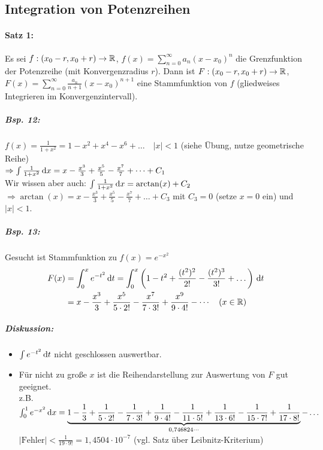 \subsection{Integration von Potenzreihen}
\paragraph{Satz 1:} Es sei $f:(x_0-r, x_0+r)\to \mathbb{R}$, $f(x)=\sum_{n=0}^\infty a_n (x-x_0)^n$ die Grenzfunktion der Potenzreihe (mit Konvergenzradius $r$). Dann ist $F: (x_0-r,x_0+r)\to \mathbb{R}$, $F(x)=\sum_{n=0}^\infty \frac{a_n}{n+1}(x-x_0)^{n+1}$ eine Stammfunktion von $f$ (gliedweises Integrieren im Konvergenzintervall).
\subparagraph{Bsp. 12:} \parskp
$f(x)=\frac{1}{1+x^2}=1-x^2+x^4-x^6+\dots \quad |x|<1$ (siehe Übung, nutze geometrische Reihe)\\
$\Rightarrow \int \frac{1}{1+x^2}\,\mathrm{d}x=x-\frac{x^3}{3}+\frac{x^5}{5}-\frac{x^7}{7}+\dots + C_1$\\
Wir wissen aber auch: $\int \frac{1}{1+x^2}\,\mathrm{d}x=\arctan (x) + C_2$\\
$\Rightarrow \arctan(x) = x-\frac{x^3}{3}+\frac{x^5}{5}-\frac{x^7}{7}+\dots + C_3$ \quad mit $C_3=0$ (setze $x=0$ ein) und $|x|<1$.
\subparagraph{Bsp. 13:} Gesucht ist Stammfunktion zu $f(x)=e^{-x^2}$
\begin{align*}
F(x)&=\int_0^x e^{-t^2}\,\mathrm{d}t=\int_0^x\left(1-t^2+\frac{(t^2)^2}{2!}-\frac{(t^2)^3}{3!}+\dots\right)\,\mathrm{d}t\\
&= x - \frac{x^3}{3}+\frac{x^5}{5\cdot 2!}-\frac{x^7}{7\cdot 3!}+\frac{x^9}{9\cdot 4!}-\cdots 
\quad (x\in \mathbb{R})
\end{align*}
\subparagraph{Diskussion:} 
\begin{itemize}
\item $\int e^{-t^2}\,\mathrm{d}t$ nicht geschlossen auswertbar.
\item Für nicht zu große $x$ ist die Reihendarstellung zur Auswertung von $F$ gut geeignet.\\
z.B. $\int_0^1 e^{-x^2}\,\mathrm{d}x=\underbrace{1-\frac{1}{3}+\frac{1}{5\cdot 2!}-\frac{1}{7\cdot 3!}+\frac{1}{9\cdot 4!}-\frac{1}{11\cdot 5!}+\frac{1}{13\cdot 6!}-\frac{1}{15\cdot 7!}+\frac{1}{17\cdot 8!}}_{0,746824\cdots}-\dots$\\
$\left|\text{Fehler}\right| < \frac{1}{19\cdot 9!}=1,4504\cdot 10^{-7}$ (vgl. Satz über Leibnitz-Kriterium)
\end{itemize}

